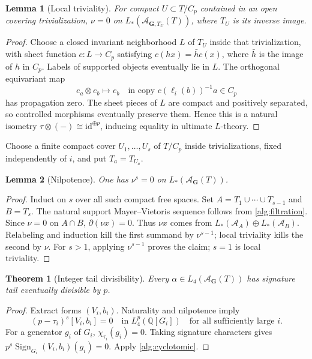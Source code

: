 \documentclass[11pt]{amsart}
\numberwithin{equation}{section}
\newtheorem{theorem}{Theorem}[section]
\newtheorem{lemma}[lemma]{Lemma}
\theoremstyle{definition}
\theoremstyle{remark}
\DeclareMathOperator{\Sign}{Sign}
\newcommand{\Q}{\mathbb Q}
\begin{document}
\begin{lemma}[Local triviality]\label{alg:localtrivial}
For compact $U\subset T/C_p$ contained in an open covering
trivialization, $\nu=0$ on $L_*(\mathcal A_{\mathbf G,T_U}(T))$,
where $T_U$ is its inverse image.
\end{lemma}
\begin{proof}
Choose a closed invariant neighborhood $L$ of $T_U$ inside that
trivialization, with sheet function $c:L\to C_p$ satisfying
$c(hx)=\bar h c(x)$, where $\bar h$ is the image of $h$ in $C_p$.
Labels of supported objects eventually lie in
$L$. The orthogonal equivariant map
\begin{equation}\label{alg:localisometry}
 e_a\otimes e_b\longmapsto e_b
 \quad\text{in copy }c(\ell_i(b))^{-1}a\in C_p
\end{equation}
has propagation zero. The sheet pieces of $L$ are compact and
positively separated, so controlled morphisms eventually preserve
them. Hence this is a natural isometry $\tau\otimes(-)\cong
\mathrm{id}^{\oplus p}$, inducing equality in ultimate $L$-theory.
\end{proof}

Choose a finite compact cover $U_1,\ldots,U_s$ of $T/C_p$ inside
trivializations, fixed independently of $i$, and put $T_a=T_{U_a}$.

\begin{lemma}[Nilpotence]\label{alg:nilpotence}
One has $\nu^s=0$ on $L_*(\mathcal A_{\mathbf G}(T))$.
\end{lemma}
\begin{proof}
Induct on $s$ over all such compact free spaces. Set
$A=T_1\cup\cdots\cup T_{s-1}$ and $B=T_s$.
The natural support Mayer--Vietoris sequence follows from
\cref{alg:filtration}. Since $\nu=0$ on $A\cap B$, $\partial(\nu x)=0$.
Thus $\nu x$ comes from $L_*(\mathcal A_A)\oplus L_*(\mathcal A_B)$.
Relabeling and induction kill the first summand by $\nu^{s-1}$;
local triviality kills the second by $\nu$. For $s>1$, applying
$\nu^{s-1}$ proves the claim; $s=1$ is local triviality.
\end{proof}

\begin{theorem}[Integer tail divisibility]\label{alg:divisibility}
Every $\alpha\in L_4(\mathcal A_{\mathbf G}(T))$ has signature tail
eventually divisible by $p$.
\end{theorem}
\begin{proof}
Extract forms $(V_i,b_i)$. Naturality and nilpotence imply
\begin{equation}\label{alg:factorannihilation}
 (p-\tau_i)^s[V_i,b_i]=0\quad\text{in }L_4^p(\Q[G_i])
 \quad\text{for all sufficiently large }i.
\end{equation}
For a generator $g_i$ of $G_i$, $\chi_{\tau_i}(g_i)=0$. Taking
signature characters gives $p^s\Sign_{G_i}(V_i,b_i)(g_i)=0$.
Apply \cref{alg:cyclotomic}.
\end{proof}
\end{document}

